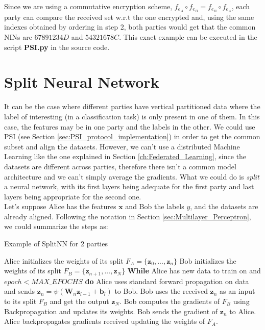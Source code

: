Since we are using a commutative encryption scheme, $f_{e_A} \circ f_{e_B} = f_{e_B} \circ f_{e_A}$, each party can compare the received set w.r.t the one encrypted and, using the same indexes obtained by ordering in step 2, both parties would get that the common NINs are $67891234D$ and $54321678C$. This exact example can be executed in the script \textbf{PSI.py} in the source code.

\section{Split Neural Network}

It can be the case where different parties have vertical partitioned data where the label of interesting (in a classification task) is only present in one of them. In this case, the features may be in one party and the labels in the other. We could use PSI (see Section \ref{sec:PSI_protocol_implementation}) in order to get the common subset and align the datasets.
However, we can't use a distributed Machine Learning like the one explained in Section \ref{ch:Federated_Learning}, since the datasets are different across parties, therefore there isn't a common model architecture and we can't simply average the gradients. What we could do is \textit{split} a neural network, with its first layers being adequate for the first party and last layers being appropriate for the second one.\\
Let's suppose Alice has the features $\boldsymbol{x}$ and Bob the labels $y$, and the datasets are already aligned. Following the notation in Section \ref{sec:Multilayer_Perceptron}, we could summarize the steps as:


\begin{algorithm}
\caption{Example of SplitNN for 2 parties}
\label{alg:SplitNN}
\begin{algorithmic}[1]
    \State Alice initializes the weights of its split $F_A = \{\boldsymbol{z}_0,...,\boldsymbol{z}_n\}$
    \State Bob initializes the weights of its split $F_B = \{\boldsymbol{z}_{n+1},...,\boldsymbol{z}_N\}$
    \State \textbf{While} Alice has new data to train on and $epoch < MAX\_EPOCHS$  \textbf{do}
    \State Alice uses standard forward propagation on data and sends $\boldsymbol{z}_n = \psi(\boldsymbol{W}_n \boldsymbol{z}_{l-1} + \boldsymbol{b}_l)$ to Bob.
    \State Bob uses the received $\boldsymbol{z}_n$ as an input to its split $F_B$ and get the output $\boldsymbol{z}_N$.
    \State Bob computes the gradients of $F_B$ using Backpropagation and updates its weights.
    \State Bob sends the gradient of $\boldsymbol{z}_n$ to Alice.
    \State Alice backpropagates gradients received updating the weights of $F_A$.
\end{algorithmic}
\end{algorithm}

